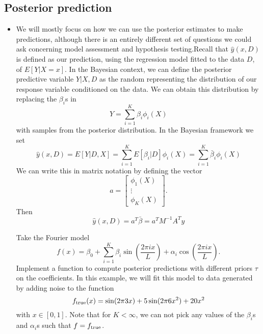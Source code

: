 \subsection{Posterior prediction}
\begin{itemize}


\item We will mostly focus on how we can use the posterior estimates to make predictions, although there is an entirely different set of questions we could ask concerning model assessment and hypothesis testing.Recall that $\hat{y}(x,D)$ is defined as our prediction, using the regression model fitted to the data $D$, of $E[Y|X=x]$. In the Bayesian context, we can define the posterior predictive variable $Y|X,D$ as the random representing the distribution of our response variable conditioned on the data. We can obtain this distribution by replacing the $\beta_i$s in 
\begin{equation*}
Y = \sum_{i=1}^{K}\beta_i\phi_i(X)
\end{equation*}
with samples from the posterior distribution. In the Bayesian framework we set
\begin{equation*}
\hat{y}(x,D) = E[Y|D,X] = \sum_{i=1}^{K}E[\beta_i|D]\phi_i(X) = \sum_{i=1}^{K}\bar{\beta}_i\phi_i(X) 
\end{equation*}
We can write this in matrix notation by defining the vector 
\begin{equation*}
a = \left[\begin{array}{c}
\phi_1(X)\\
\vdots\\
\phi_K(X)
\end{array}\right].
\end{equation*}
Then 
\begin{equation}\label{eq:yhatmatrixform}
\hat{y}(x,D) = a^T\bar{\beta} = a^TM^{-1}A^Ty
\end{equation}


\begin{example}\label{ex:fourier regularization}
Take the Fourier model
\begin{equation*}
f(x) =\beta_0 +  \sum_{i=1}^K\beta_i \sin\left(\frac{2\pi i x}{L} \right) + \alpha_i \cos\left(\frac{2\pi i x}{L} \right).
\end{equation*}
Implement a function to compute posterior predictions with different priors $\tau$ on the coefficients. In this example, we will fit this model to data generated by adding noise to the function 
\begin{equation*}
f_{\rm true}(x) = \sin(2\pi 3x) + 5\sin(2\pi 6x^2) + 20x^2
\end{equation*}
with $x \in [0,1]$.
Note that for $K<\infty$, we can not pick any values of the $\beta_i$s and $\alpha_i$s such that $f = f_{\rm true}$.  \\ 


\end{example}
\end{itemize}
